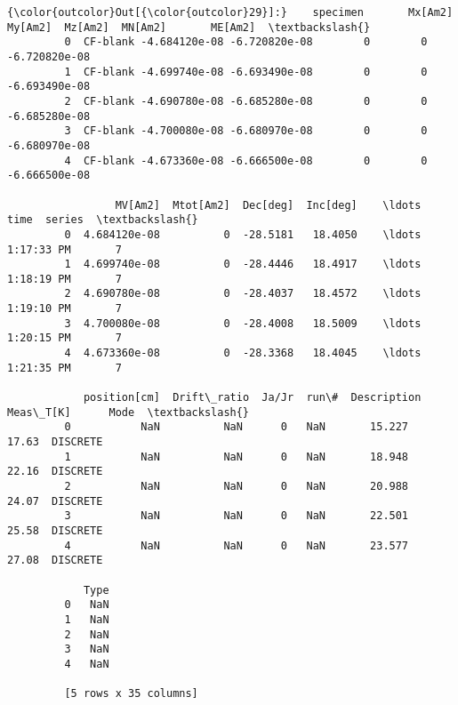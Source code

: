 \documentclass{article}
\begin{document}
            \begin{Verbatim}[commandchars=\\\{\}]
{\color{outcolor}Out[{\color{outcolor}29}]:}    specimen       Mx[Am2]       My[Am2]  Mz[Am2]  MN[Am2]       ME[Am2]  \textbackslash{}
         0  CF-blank -4.684120e-08 -6.720820e-08        0        0 -6.720820e-08   
         1  CF-blank -4.699740e-08 -6.693490e-08        0        0 -6.693490e-08   
         2  CF-blank -4.690780e-08 -6.685280e-08        0        0 -6.685280e-08   
         3  CF-blank -4.700080e-08 -6.680970e-08        0        0 -6.680970e-08   
         4  CF-blank -4.673360e-08 -6.666500e-08        0        0 -6.666500e-08   
         
                 MV[Am2]  Mtot[Am2]  Dec[deg]  Inc[deg]    \ldots           time  series  \textbackslash{}
         0  4.684120e-08          0  -28.5181   18.4050    \ldots     1:17:33 PM       7   
         1  4.699740e-08          0  -28.4446   18.4917    \ldots     1:18:19 PM       7   
         2  4.690780e-08          0  -28.4037   18.4572    \ldots     1:19:10 PM       7   
         3  4.700080e-08          0  -28.4008   18.5009    \ldots     1:20:15 PM       7   
         4  4.673360e-08          0  -28.3368   18.4045    \ldots     1:21:35 PM       7   
         
            position[cm]  Drift\_ratio  Ja/Jr  run\#  Description  Meas\_T[K]      Mode  \textbackslash{}
         0           NaN          NaN      0   NaN       15.227      17.63  DISCRETE   
         1           NaN          NaN      0   NaN       18.948      22.16  DISCRETE   
         2           NaN          NaN      0   NaN       20.988      24.07  DISCRETE   
         3           NaN          NaN      0   NaN       22.501      25.58  DISCRETE   
         4           NaN          NaN      0   NaN       23.577      27.08  DISCRETE   
         
            Type  
         0   NaN  
         1   NaN  
         2   NaN  
         3   NaN  
         4   NaN  
         
         [5 rows x 35 columns]
\end{Verbatim}
        
\end{document}
